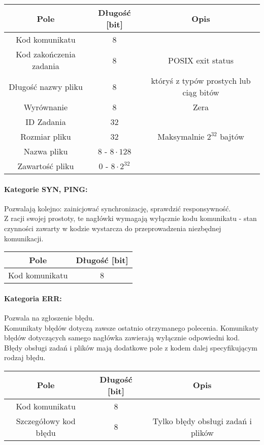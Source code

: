 \documentclass[10pt,a4paper]{article}
\begin{document}
            \begin{tabular}{ c | c | c }
			    \textbf{Pole} & \textbf{Długość [bit]} & \textbf{Opis} \\
			    \hline
			    Kod komunikatu & 8 & \\
			    Kod zakończenia zadania & 8 & POSIX exit status \\
			    Długość nazwy pliku & 8 & któryś z typów prostych lub ciąg bitów \\
			    Wyrównanie & 8 & Zera \\
			    ID Zadania & 32 & \\
			    Rozmiar pliku & 32 & Maksymalnie $ 2^{32} $ bajtów \\
			    Nazwa pliku & 8 - $ 8 \cdot 128 $ &  \\
			    Zawartość pliku & 0 - $ 8 \cdot 2^{32} $ &  \\
			\end{tabular}
			
			\paragraph{Kategorie SYN, PING:\\}
            Pozwalają kolejno: zainicjować synchronizację, sprawdzić responsywność. \\
            Z racji swojej prostoty, te nagłówki wymagają wyłącznie kodu komunikatu - stan czynności zawarty w kodzie wystarcza do przeprowadzenia niezbędnej komunikacji.
            
            \begin{tabular}{ c | c  }
			    \textbf{Pole} & \textbf{Długość [bit]} \\
			    \hline
			    Kod komunikatu & 8 \\
			\end{tabular}
						
			\paragraph{Kategoria ERR:\\}
            Pozwala na zgłoszenie błędu. \\
            Komunikaty błędów dotyczą zawsze ostatnio otrzymanego polecenia. Komunikaty błędów dotyczących samego nagłówka zawierają wyłącznie odpowiedni kod. Błędy obsługi zadań i plików mają dodatkowe pole z kodem dalej specyfikującym rodzaj błędu. 
            
            \begin{tabular}{ c | c | c  }
			    \textbf{Pole} & \textbf{Długość [bit]} & \textbf{Opis} \\
			    \hline
			    Kod komunikatu & 8 & \\
			    Szczegółowy kod błędu & 8 & Tylko błędy obsługi zadań i plików \\
			\end{tabular}
			
\end{document}
